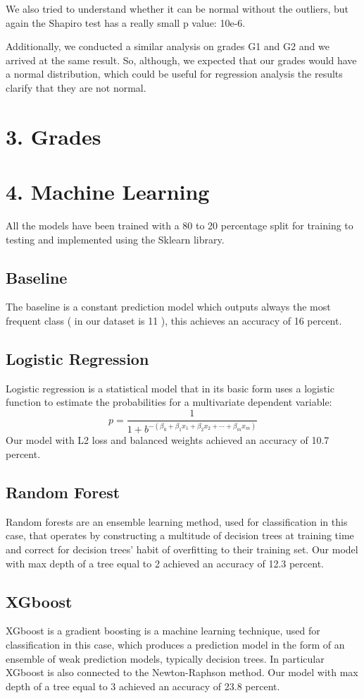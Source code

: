 \documentclass[a4paper, 11pt]{report}
\theoremstyle{definition}
\numberwithin{equation}{section}		%
\numberwithin{figure}{section}			%
\numberwithin{table}{section}				%
\begin{document}
We also tried to understand whether it can be normal without the outliers, but again the Shapiro test has a really small p value: 10e-6.

Additionally, we conducted a similar analysis on grades G1 and G2 and we arrived at the same result. So, although, we expected that our grades would
have a normal distribution, which could be useful for regression analysis
the results clarify that they are not normal.

\section*{3. Grades}


\section*{4. Machine Learning}

All the models have been trained with a 80 to 20 percentage split for training to testing and implemented using the Sklearn library.

\subsection*{Baseline}
The baseline is a constant prediction model which outputs always the most frequent class ( in our dataset is 11 ), this achieves an accuracy of 16 percent.
\subsection*{Logistic Regression}
Logistic regression is a statistical model that in its basic form uses a logistic function to estimate the probabilities for a multivariate dependent variable: $$p=\frac{1}{1+b^{-\left(\beta_{0}+\beta_{1} x_{1}+\beta_{2} x_{2}+\cdots+\beta_{m} x_{m}\right)}}$$
Our model with L2 loss and balanced weights achieved an accuracy of 10.7 percent. 
\subsection*{Random Forest}
Random forests are an ensemble learning method, used for classification in this case, that operates by constructing a multitude of decision trees at training time and correct for decision trees' habit of overfitting to their training set. Our model with max depth of a tree equal to 2 achieved an accuracy of 12.3 percent.
\subsection*{XGboost}
XGboost is a gradient boosting is a machine learning technique, used for classification in this case, which produces a prediction model in the form of an ensemble of weak prediction models, typically decision trees. In particular XGboost is also connected to the Newton-Raphson method. Our model with max depth of a tree equal to 3 achieved an accuracy of 23.8 percent.
\end{document}
